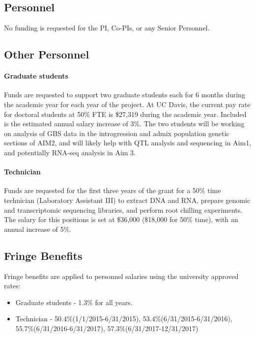 
\renewcommand{\thepage}{f. Budget Justification - Page \arabic{page} of 3}


\subsection*{Personnel}

No funding is requested for the PI, Co-PIs, or any Senior Personnel.

\subsection*{Other Personnel}
\paragraph{Graduate students} 
Funds are requested to support two graduate students each for 6 months during the academic year for each year of the project. At UC Davis, the current pay rate for doctoral students at 50\% FTE is \$27,319 during the academic year. Included is the estimated annual salary increase of 3\%.  The two students will be working on analysis of GBS data in the introgression and admix population genetic sections of AIM2, and will likely help with QTL analysis and sequencing in Aim1, and potentially RNA-seq analysis in Aim 3.

\paragraph{Technician}
Funds are requested for the first three years of the grant for a 50\% time technician (Laboratory Assistant III) to extract DNA and RNA, prepare genomic and transcriptomic sequencing libraries, and perform root chilling experiments.  The salary for this positions is set at \$36,000 (\$18,000 for 50\% time), with an annual increase of 5\%.

\subsection*{Fringe Benefits}
Fringe benefits are applied to personnel salaries using the university approved rates:
\begin{itemize}
\item Graduate students - 1.3\% for all years.
\item Technician - 50.4\%(1/1/2015-6/31/2015), 53.4\%(6/31/2015-6/31/2016), 55.7\%(6/31/2016-6/31/2017), 57.3\%(6/31/2017-12/31/2017)
\end{itemize}

